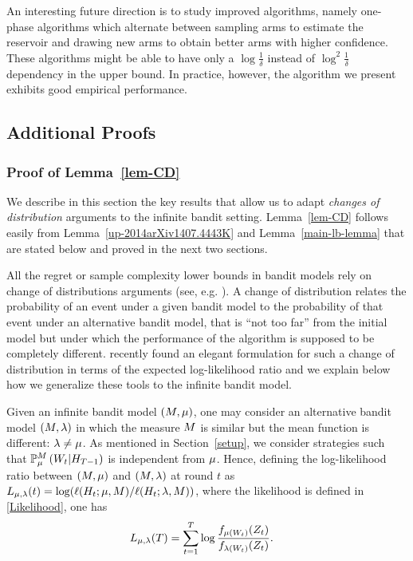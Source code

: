 An interesting future direction is to study improved algorithms, namely
one-phase algorithms which alternate between sampling arms to estimate the 
reservoir and drawing new arms to obtain better arms with higher confidence.
These algorithms might be able to have only a $\log\frac{1}{\delta}$ instead of
$\log^2 \frac{1}{\delta}$ dependency in the upper bound.
In practice, however, the algorithm we present exhibits good empirical 
performance.

\newpage
%

\subsection{Additional Proofs}\label{supp-proofs}

\subsubsection{Proof of Lemma~\ref{lem-CD}} \label{proof-CD}

We describe in this section the key results that allow us to adapt
\emph{changes of distribution} arguments to the infinite bandit setting.
Lemma~\ref{lem-CD} follows easily from Lemma~\ref{up-2014arXiv1407.4443K} and 
Lemma~\ref{main-lb-lemma} that are stated below and proved in the next two sections.

All the regret or sample complexity lower bounds in bandit models rely on
change of distributions arguments (see, e.g.
\cite{LaiRobbins85bandits,BurnKat96,Bubeck10BestArm}). A change of distribution
relates the probability of an event under a given bandit model to the
probability of that event under an alternative bandit model, that is ``not too
far'' from the initial model but under which the performance of the algorithm
is supposed to be completely different. \cite{Combes14Lip,JMLR15} recently
found an elegant formulation for such a change of distribution in terms of the
expected log-likelihood ratio and we explain below how we generalize these
tools to the infinite bandit model.

Given an infinite bandit model $(M,\mu)$, one may consider an alternative
bandit model $(M,\lambda)$ in which the measure $M$ is similar but the
mean function is different: $\lambda \neq \mu$. As mentioned in
Section~\ref{setup}, we consider strategies such that
$\mathbb{P}_{\mu}^M\left(  W_t | H_{T-1}  \right)$ is independent from $\mu$. Hence, defining the log-likelihood
ratio between $(M,\mu)$ and $(M,\lambda)$ at round $t$ as
$L_{\mu,\lambda}(t) = \log(\ell(H_t ; \mu,M) / \ell(H_t; \lambda,M))$, where the likelihood is defined in 
\eqref{Likelihood}, one has 
\begin{align}
L_{\mu,\lambda}(T)
    &= \sum_{t=1}^T \log \frac{f_{\mu(W_t)}(Z_t)}{f_{\lambda(W_t)}(Z_t)}.\label{logLikelihood}
\end{align}


